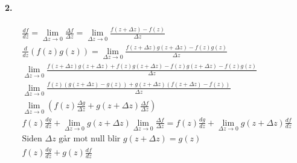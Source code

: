 \documentclass[11pt, A4paper,norsk]{article}
\begin{document}
		\paragraph{2.}
			\begin{gather}
\frac{df}{dz} = \lim_{\Delta z \rightarrow 0} \frac{\Delta f}{\Delta z} = \lim_{\Delta z \rightarrow 0} \frac{f(z + \Delta z) - f(z)}{\Delta z} \\
\frac{d}{dz}\left( f(z)g(z) \right) = \lim_{\Delta z \rightarrow 0} \frac{f(z + \Delta z)g(z + \Delta z) - f(z)g(z)}{\Delta z} \\
\lim_{\Delta z \rightarrow 0} \frac{f(z + \Delta z)g(z + \Delta z) + f(z)g(z + \Delta z) - f(z)g(z + \Delta z) - f(z)g(z)}{\Delta z} \nonumber \\
\lim_{\Delta z \rightarrow 0} \frac{f(z)\left( g(z + \Delta z) - g(z) \right) + g(z + \Delta z)\left( f(z + \Delta z) - f(z) \right)}{\Delta z} \\
\lim_{\Delta z \rightarrow 0} \left( f(z) \frac{\Delta g}{\Delta z} + g(z + \Delta z) \frac{\Delta f}{\Delta z} \right) \\
f(z) \frac{dg}{dz} + \lim_{\Delta z \rightarrow 0} g(z + \Delta z) \lim_{\Delta z \rightarrow 0} \frac{\Delta f}{\Delta z} = f(z) \frac{dg}{dz} + \lim_{\Delta z \rightarrow 0} g(z + \Delta z) \frac{df}{dz} \\
\text{Siden $\Delta z$ går mot null blir $g(z + \Delta z) = g(z)$} \nonumber \\
f(z) \frac{dg}{dz} + g(z) \frac{df}{dz}
			\end{gather}


			








\clearpage
\end{document}

